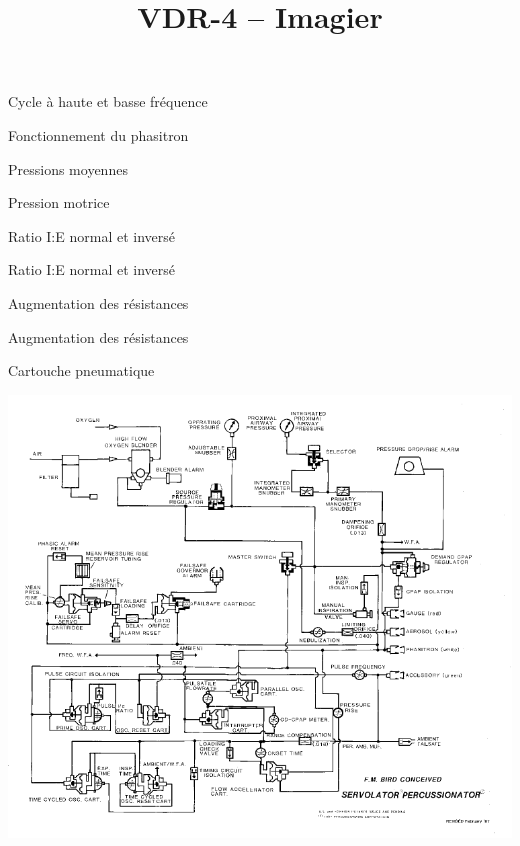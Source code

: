 \documentclass[aspectratio=169]{beamer}
\title{VDR-4 -- Imagier}
\institute{}
\begin{document}
\maketitle

\begin{frame}{Cycle à haute et basse fréquence}
	
\end{frame}

\begin{frame}{Fonctionnement du phasitron}
	
\end{frame}

\begin{frame}{Pressions moyennes}
	
\end{frame}

\begin{frame}{Pression motrice}
	
\end{frame}

\begin{frame}{Ratio I:E normal et inversé}
	
\end{frame}

\begin{frame}{Ratio I:E normal et inversé}
	
\end{frame}

\begin{frame}{Augmentation des résistances}
	
\end{frame}

\begin{frame}{Augmentation des résistances}
	
\end{frame}

\begin{frame}{Cartouche pneumatique}
	
\end{frame}

\begin{frame}[b]
	\centering
	\includegraphics[height=\textheight]{img/circuit-logique.pdf}
\end{frame}
\end{document}
